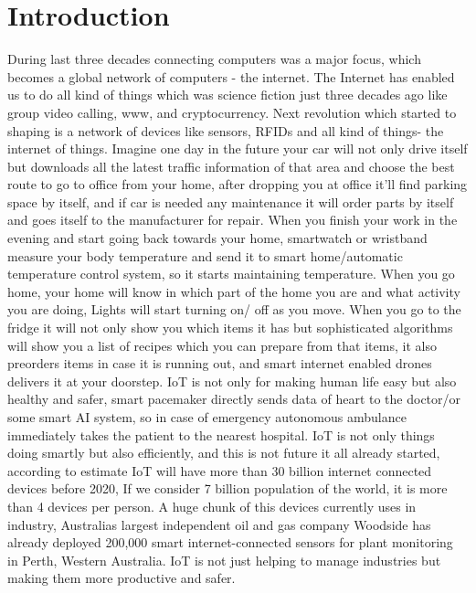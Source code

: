 \documentclass[preprint,10pt,5p]{elsarticle}
\begin{document}
\section{Introduction}
During last three decades connecting computers was a major focus, which becomes a global network of computers - the internet. The Internet has enabled us to do all kind of things which was science fiction just three decades ago like group video calling, www, and cryptocurrency. 
Next revolution which started to shaping is a network of devices like sensors,  RFIDs and all kind of things- the internet of things. 
Imagine one day in the future your car will not only drive itself but downloads all the latest traffic information of that area and choose the best route to go to office from your home, after dropping you at office it'll find parking space by itself, and if car is needed any maintenance it will order parts by itself and goes itself to the manufacturer for repair.\cite{gerla2014internet} When you finish your work in the evening and start going back towards your home, smartwatch or wristband measure your body temperature and send it to smart home/automatic temperature control system, so it starts maintaining temperature. When you go home, your home will know in which part of the home you are and what activity you are doing, Lights will start turning on/ off as you move.\cite{han2010smart} When you go to the fridge it will not only show you which items it has but sophisticated algorithms will show you a list of recipes which you can prepare from that items, it also preorders items in case it is running out, and smart internet enabled drones delivers it at your doorstep.\cite{helal2005gator}\cite{zhou2014unmanned} IoT is not only for making human life easy but also healthy and safer, smart pacemaker directly sends data of heart to the doctor/or some smart AI system, so in case of emergency autonomous ambulance immediately takes the patient to the nearest hospital.\cite{hernandez2001real} IoT is not only things doing smartly but also efficiently, and this is not future it all already started, according to estimate IoT will have more than 30 billion internet connected devices before 2020, If we consider 7 billion population of the world, it is more than 4 devices per person.\cite{atzori2010internet} A huge chunk of this devices currently uses in industry, Australias largest independent oil and gas company Woodside has already deployed 200,000 smart internet-connected sensors for plant monitoring in Perth, Western Australia. IoT is not just helping to manage industries but making them more productive and safer.\cite{Bloede2015}
\end{document}
